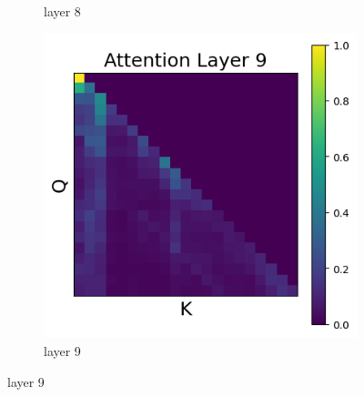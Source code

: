 \documentclass[11pt]{article}
\begin{document}
\begin{figure}[t]
\begin{subfigure}[t]{0.24\textwidth}
    \caption{layer 8}
  \end{subfigure}\hfill
      \begin{subfigure}[t]{0.24\textwidth}
    \centering
    \includegraphics[width=1.4\columnwidth]{figures/intervention2/layer_9.png}
    \caption{layer 9}
  \end{subfigure}\hfill
    

\end{figure}
\end{document}
